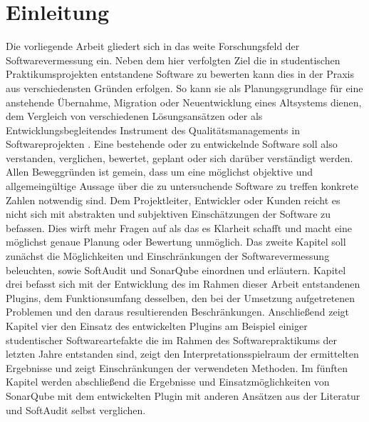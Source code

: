 \documentclass[gb,ngerman]{stthesis}
\begin{document}
	\chapter{Einleitung}
  		Die vorliegende Arbeit gliedert sich in das weite Forschungsfeld der Softwarevermessung ein. Neben dem hier verfolgten Ziel die in studentischen Praktikumsprojekten entstandene Software zu bewerten kann dies in der Praxis aus verschiedensten Gründen erfolgen. So kann sie als Planungsgrundlage für eine anstehende Übernahme, Migration oder Neuentwicklung eines Altsystems dienen, dem Vergleich von verschiedenen Lösungsansätzen oder als Entwicklungsbegleitendes Instrument des Qualitätsmanagements in Softwareprojekten \cite{SoftwareInZahlen}. Eine bestehende oder zu entwickelnde Software soll also verstanden, verglichen, bewertet, geplant oder sich darüber verständigt werden. Allen Beweggründen ist gemein, dass um eine möglichst objektive und allgemeingültige Aussage über die zu untersuchende Software zu treffen konkrete Zahlen notwendig sind. Dem Projektleiter, Entwickler oder Kunden reicht es nicht sich mit abstrakten und subjektiven Einschätzungen der Software zu befassen. Dies wirft mehr Fragen auf als das es Klarheit schafft und macht eine möglichst genaue Planung oder Bewertung unmöglich. \newline
  		Das zweite Kapitel soll zunächst die Möglichkeiten und Einschränkungen der Softwarevermessung beleuchten, sowie SoftAudit und SonarQube einordnen und erläutern. \newline
  		Kapitel drei befasst sich mit der Entwicklung des im Rahmen dieser Arbeit entstandenen Plugins, dem Funktionsumfang desselben, den bei der Umsetzung aufgetretenen Problemen und den daraus resultierenden Beschränkungen. \newline
  		Anschließend zeigt Kapitel vier den Einsatz des entwickelten Plugins am Beispiel einiger studentischer Softwareartefakte die im Rahmen des Softwarepraktikums der letzten Jahre entstanden sind, zeigt den Interpretationsspielraum der ermittelten Ergebnisse und zeigt Einschränkungen der verwendeten Methoden. \newline
  		Im fünften Kapitel werden abschließend die Ergebnisse und Einsatzmöglichkeiten von SonarQube mit dem entwickelten Plugin mit anderen Ansätzen aus der Literatur und SoftAudit selbst verglichen.
  		
\end{document}
